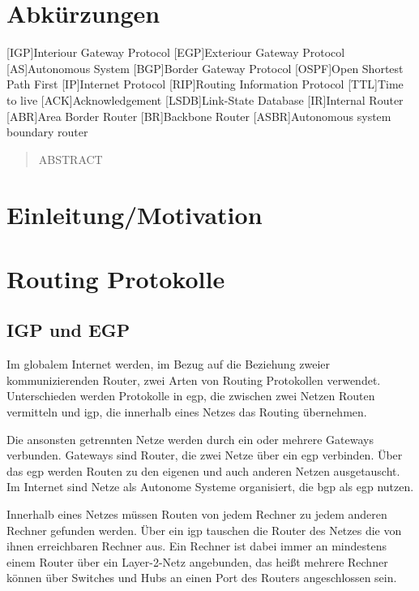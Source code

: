 \documentclass[11pt,a4paper,final]{article}
\begin{document}
\section*{Abkürzungen}
\begin{acronym}
		[IGP]{Interiour Gateway Protocol}
		[EGP]{Exteriour Gateway Protocol}
		[AS]{Autonomous System}
		[BGP]{Border Gateway Protocol}
		{Open Shortest Path First}
		[IP]{Internet Protocol}
		[RIP]{Routing Information Protocol}
		[TTL]{Time to live}
		[ACK]{Acknowledgement}
		{Link-State Database}
		[IR]{Internal Router}
		[ABR]{Area Border Router}
		[BR]{Backbone Router}
		{Autonomous system boundary router}
\end{acronym}
\newpage
\setcounter{page}{1}
\begin{abstract}
ABSTRACT

\end{abstract}

\section{Einleitung/Motivation}



\section{Routing Protokolle}
\subsection{IGP und EGP}
Im globalem Internet werden, im Bezug auf die Beziehung zweier kommunizierenden Router, zwei Arten von Routing Protokollen verwendet. Unterschieden werden Protokolle in \ac{egp}, die zwischen zwei Netzen Routen vermitteln und \ac{igp}, die innerhalb eines Netzes das Routing übernehmen.

Die ansonsten getrennten Netze werden durch ein oder mehrere Gateways verbunden. Gateways sind Router, die zwei Netze über ein \ac{egp} verbinden. Über das \ac{egp} werden Routen zu den eigenen und auch anderen Netzen ausgetauscht. Im Internet sind Netze als Autonome Systeme organisiert, die \ac{bgp} als \ac{egp} nutzen.

Innerhalb eines Netzes müssen Routen von jedem Rechner zu jedem anderen Rechner gefunden werden. Über ein \ac{igp} tauschen die Router des Netzes die von ihnen erreichbaren Rechner aus.
Ein Rechner ist dabei immer an mindestens einem Router über ein Layer-2-Netz angebunden, das heißt mehrere Rechner können über Switches und Hubs an einen Port des Routers angeschlossen sein.
\end{document}
